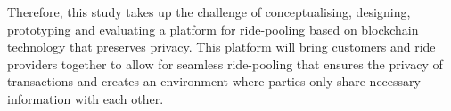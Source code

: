 Therefore, this study takes up the challenge of conceptualising, designing, prototyping and evaluating a platform for ride-pooling based on blockchain technology that preserves privacy. This platform will bring customers and ride providers together to allow for seamless ride-pooling that ensures the privacy of transactions and creates an environment where parties only share necessary information with each other.





